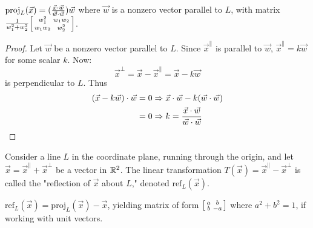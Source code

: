 \documentclass[a4paper,8pt]{article}
\begin{document}
\begin{outline}
    \(\text{proj}_{L}(\vec{x}) = (\frac{\vec{x}\cdot\vec{w}}{\vec{w}\cdot\vec{w}})\vec{w}\)
    where \(\vec{w}\) is a nonzero vector parallel to \(L\), with matrix \(\frac{1}{w_1^2 + w_2^2}
    \begin{bsmallmatrix} w_1^2&w_1w_2\\ w_1w_2&w_2^2 \end{bsmallmatrix}\).

    \begin{proof}
      Let \(\vec{w}\) be a nonzero vector parallel to \(L\). Since \(\vec{x}^{\parallel}\)
      is parallel to \(\vec{w}\),
      \(\vec{x}^{\parallel} = k\vec{w}\) for some scalar \(k\). Now:
      \[
        \vec{x}^{\perp} = \vec{x} - \vec{x}^{\parallel} = \vec{x} - k\vec{w}
      \]
      is perpendicular to \(L\). Thus
      \begin{align*}
        (\vec{x} - k\vec{w}) \cdot \vec{w} &= 0 \Rightarrow \vec{x}\cdot\vec{w} - k(\vec{w}\cdot\vec{w})\\
                                           &= 0 \Rightarrow k = \frac{\vec{x}\cdot\vec{w}}{\vec{w}\cdot\vec{w}}
      \end{align*}
    \end{proof}

    Consider a line \(L\) in the coordinate plane, running through the origin, and let
    \(\vec{x} = \vec{x}^{\parallel} + \vec{x}^{\perp}\) be a vector in \(\mathbb{R}^2\). The linear transformation
    \(T(\vec{x}) = \vec{x}^{\parallel} - \vec{x}^{\perp}\) is called the "reflection of \(\vec{x}\) about \(L\),"
    denoted \(\text{ref}_{L}(\vec{x})\).

    \(\text{ref}_{L}(\vec{x}) = \text{proj}_{L}(\vec{x}) - \vec{x}\), yielding matrix of form
    \(\begin{bsmallmatrix} a&b\\ b&-a \end{bsmallmatrix}\) where \(a^2 + b^2 = 1\), if working with unit vectors.


\end{outline}
\end{document}
